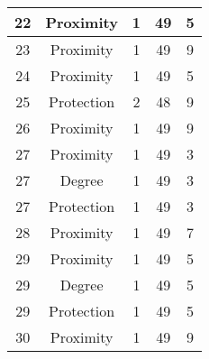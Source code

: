 \documentclass[results.tex]{subfiles}
\begin{document}
\begin{center}
\begin{tabular}{| c || c | c | c | c |}
            \hline
            22                      & Proximity                    & 1                      & 49                      & 5                    \\
            \hline
            23                      & Proximity                    & 1                      & 49                      & 9                    \\
            \hline
            24                      & Proximity                    & 1                      & 49                      & 5                    \\
            \hline
            25                      & Protection                   & 2                      & 48                      & 9                    \\
            \hline
            26                      & Proximity                    & 1                      & 49                      & 9                    \\
            \hline
            27                      & Proximity                    & 1                      & 49                      & 3                    \\
            \hline
            27                      & Degree                       & 1                      & 49                      & 3                    \\
            \hline
            27                      & Protection                   & 1                      & 49                      & 3                    \\
            \hline
            28                      & Proximity                    & 1                      & 49                      & 7                    \\
            \hline
            29                      & Proximity                    & 1                      & 49                      & 5                    \\
            \hline
            29                      & Degree                       & 1                      & 49                      & 5                    \\
            \hline
            29                      & Protection                   & 1                      & 49                      & 5                    \\
            \hline
            30                      & Proximity                    & 1                      & 49                      & 9                    \\

\end{tabular}
\end{center}
\end{document}
